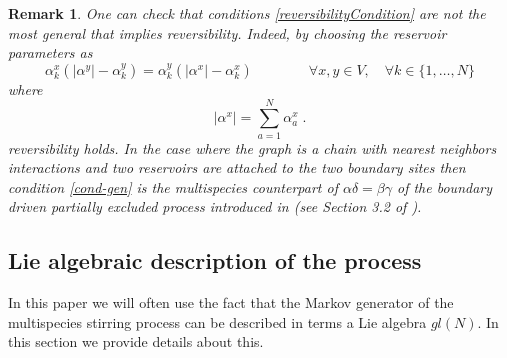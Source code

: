 \documentclass[10pt]{article}
\numberwithin{equation}{section}
\numberwithin{equation}{subsection}
\newtheorem{remark}{Remark}
\newcommand{\dt}{\;.}
\begin{document}
\begin{remark}
\label{rem-rev}
		{\color{blue}One can check that conditions \eqref{reversibilityCondition} are not the most general that implies reversibility. Indeed, by choosing the reservoir parameters as }
		\begin{equation}
		\label{cond-gen}
			\alpha_{k}^{x}\left(|\alpha^{y}|-\alpha_{k}^{y}\right)=\alpha_{k}^{y}\left(|\alpha^{x}|-\alpha_{k}^{x}\right)\qquad\qquad \forall x,y\in V,\quad \forall k\in \{1,\ldots,N\}
		\end{equation}
		where
		\begin{equation}
			|\alpha^{x}|=\sum_{a=1}^{N}\alpha_{a}^{x}\dt
		\end{equation}
		reversibility holds. 
		 In the case where the graph is a chain with nearest neighbors interactions and two reservoirs are attached to the two boundary sites
		then condition \eqref{cond-gen} is the multispecies counterpart of $\alpha\delta=\beta\gamma$ of the boundary driven partially excluded process introduced in \cite{schutzSandow} (see Section 3.2 of \cite{carinci2013duality}).
		\end{remark}
\subsection{Lie algebraic description of the process}

In this paper we will often use the fact that the Markov generator of the multispecies stirring process can be described in terms a Lie algebra ${gl}(N)$.
In this section we provide details about this.
\end{document}
